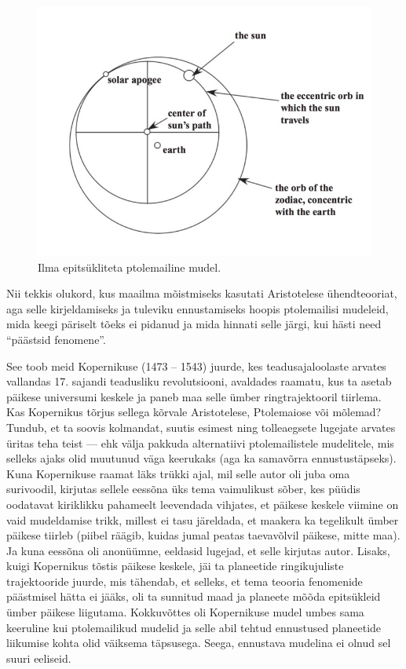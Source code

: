 \documentclass[]{book}
\begin{document}
\begin{figure}
\includegraphics[width=0.5\linewidth]{img/pt2} \caption{Ilma epitsükliteta ptolemailine mudel.}\label{fig:unnamed-chunk-3}
\end{figure}

Nii tekkis olukord, kus maailma mõistmiseks kasutati Aristotelese ühendteooriat, aga selle kirjeldamiseks ja tuleviku ennustamiseks hoopis ptolemailisi mudeleid, mida keegi päriselt tõeks ei pidanud ja mida hinnati selle järgi, kui hästi need ``päästsid fenomene''.

See toob meid Kopernikuse (1473 -- 1543) juurde, kes teadusajaloolaste arvates vallandas 17. sajandi teadusliku revolutsiooni, avaldades raamatu, kus ta asetab päikese universumi keskele ja paneb maa selle ümber ringtrajektooril tiirlema. Kas Kopernikus tõrjus sellega kõrvale Aristotelese, Ptolemaiose või mõlemad? Tundub, et ta soovis kolmandat, suutis esimest ning tolleaegsete lugejate arvates üritas teha teist --- ehk välja pakkuda alternatiivi ptolemailistele mudelitele, mis selleks ajaks olid muutunud väga keerukaks (aga ka samavõrra ennustustäpseks). Kuna Kopernikuse raamat läks trükki ajal, mil selle autor oli juba oma surivoodil, kirjutas sellele eessõna üks tema vaimulikust sõber, kes püüdis oodatavat kiriklikku pahameelt leevendada vihjates, et päikese keskele viimine on vaid mudeldamise trikk, millest ei tasu järeldada, et maakera ka tegelikult ümber päikese tiirleb (piibel räägib, kuidas jumal peatas taevavõlvil päikese, mitte maa). Ja kuna eessõna oli anonüümne, eeldasid lugejad, et selle kirjutas autor. Lisaks, kuigi Kopernikus tõstis päikese keskele, jäi ta planeetide ringikujuliste trajektooride juurde, mis tähendab, et selleks, et tema teooria fenomenide päästmisel hätta ei jääks, oli ta sunnitud maad ja planeete mõõda epitsükleid ümber päikese liigutama. Kokkuvõttes oli Kopernikuse mudel umbes sama keeruline kui ptolemailikud mudelid ja selle abil tehtud ennustused planeetide liikumise kohta olid väiksema täpsusega. Seega, ennustava mudelina ei olnud sel suuri eeliseid.
\end{document}
